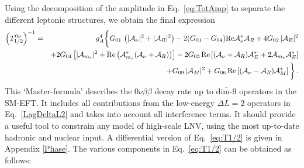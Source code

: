 \documentclass[letterpaper,11pt]{article}
\newcommand{\bea}{\begin{eqnarray}}
\newcommand{\eea}{\end{eqnarray}}
\newcommand{\sq}{^{2}}
\newcommand{\nn}{\nonumber}
\newcommand{\textoverline}[1]{$\overline{\mbox{#1}}$}
\begin{document}
Using the decomposition of the amplitude in Eq.\ \eqref{eq:TotAmp} to separate the different leptonic structures, we obtain the final expression
\bea\label{eq:T1/2}
\left(T^{0\nu}_{1/2}\right)^{-1} &=& g_A^4 \bigg\{ G_{01} \, \left( |\mathcal A_{\nu}|\sq + |\mathcal A_{R}|\sq \right)
- 2 (G_{01} - G_{04}) \textrm{Re} \mathcal A_{\nu}^* \mathcal A_{R} 
+ 4G_{02} \,|\mathcal A_{E}|\sq \nn \\ & & + 2 G_{04} \left[|\mathcal A_{m_e}|\sq+{\rm Re} \left(\mathcal A_{m_e}^* (\mathcal A_{\nu} + \mathcal A_{R})\right)\right]
-2 G_{03}\,{\rm Re}\left[ (\mathcal A_{\nu} + \mathcal A_{R} )\mathcal A_{E}^*+2\mathcal A_{m_e} \mathcal A_{E}^*\right]
\nn\\
&&+ G_{09}\, |\mathcal A_{M}|\sq + G_{06}\, {\rm Re}\left[ (\mathcal A_{\nu} - \mathcal A_{R} )\mathcal A_{M}^*\right] \bigg\}\,. 
\eea
This `Master-formula'  describes the $0\nu\beta\beta$ decay rate up to \textoverline{dim-9} operators in the SM-EFT. 
It includes all contributions from the low-energy $\Delta L=2$ operators in Eq.~\eqref{LagDeltaL2} and takes into account all interference terms. It should provide a useful tool to constrain any model of high-scale LNV,  
using the most up-to-date hadronic and nuclear input.  
 A differential version of Eq.~\eqref{eq:T1/2} is given in Appendix \ref{Phase}. 
The various components in Eq.~\eqref{eq:T1/2}  can be obtained as follows: 
\end{document}
